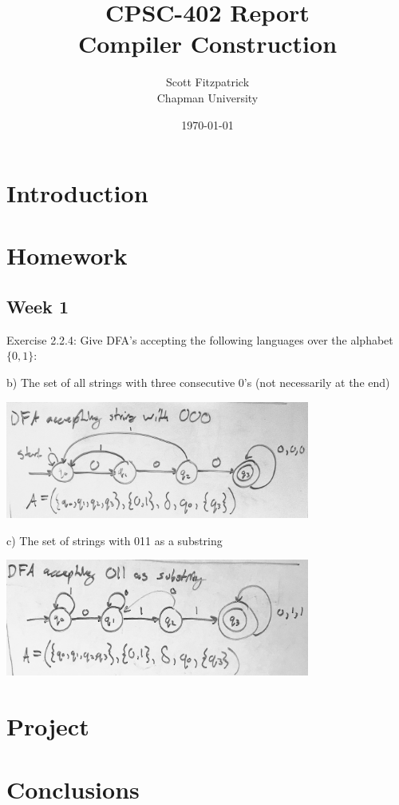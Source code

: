 \documentclass{article}
\title{CPSC-402 Report\\Compiler Construction}
\author{Scott Fitzpatrick  \\ Chapman University}
\date{\today}
\theoremstyle{theorem}
\theoremstyle{definition}
\theoremstyle{remark}
\begin{document}
\maketitle

\begin{abstract}

\end{abstract}

\tableofcontents


\section{Introduction}\label{intro}


\section{Homework}\label{homework}

\subsection{Week 1}

\noindent
Exercise 2.2.4: Give DFA's accepting the following languages over the alphabet $\{0,1\}$:

\medskip
b) The set of all strings with three consecutive 0's (not necessarily at the end)

\includegraphics[width=0.75\textwidth]{Images/2.4.4b.png}

\medskip
c) The set of strings with 011 as a substring

\includegraphics[width=0.75\textwidth]{Images/2.4.4c.png}


\section{Project}
 

\section{Conclusions}\label{conclusions}

\begin{thebibliography}{99}

\end{thebibliography}
\end{document}
